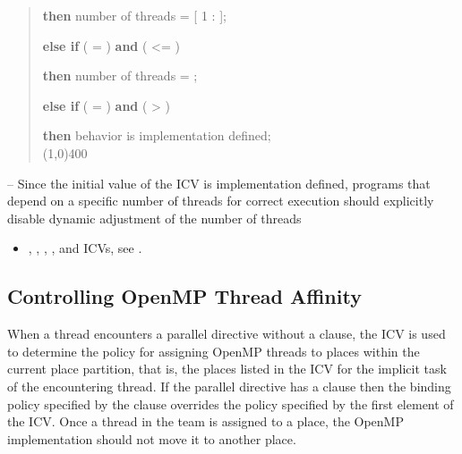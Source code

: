 \begin{samepage}
\begin{quote}
\textbf{then} number of threads = [ 1 :  ];

\textbf{else if} ( = ) \textbf{and} ( <= )

\textbf{then} number of threads = ;

\textbf{else if} ( = ) \textbf{and} ( > )

\textbf{then} behavior is implementation defined;\\[-2ex]

\nolinenumbers\line(1,0){400}\linenumbers
\end{quote}
\end{samepage}
\bigskip

\notestart
\noteheader – Since the initial value of the  ICV is implementation defined, programs 
that depend on a specific number of threads for correct execution should explicitly 
disable dynamic adjustment of the number of threads
\noteend

\crossreferences
\begin{itemize}
\item {}, , , 
, and  ICVs, see 
.
\end{itemize}










\subsection{Controlling OpenMP Thread Affinity}
\label{subsec:Controlling OpenMP Thread Affinity}

When a thread encounters a parallel directive without a  clause, the  ICV is used to determine the policy for assigning OpenMP threads to places within the current place partition, that is, the places listed in the  ICV for the implicit task of the encountering thread. If the parallel directive has a  clause then the binding policy specified by the  clause overrides the policy specified by the first element of the  ICV. Once a thread in the team is assigned to a place, the OpenMP implementation should not move it to another place. 

